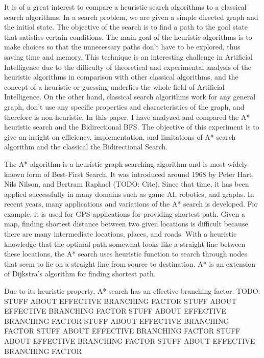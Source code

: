 \documentclass[conference]{IEEEtran}
\begin{document}

It is of a great interest to compare a heuristic search algorithms to a classical search algorithms. In a search problem, we are given a simple directed graph and the initial state. The objective of the search is to find a path to the goal state that satisfies certain conditions. The main goal of the heuristic algorithms is to make choices so that the unnecessary paths don't have to be explored, thus saving time and memory. This technique is an interesting challenge in Artificial Intelligence due to the difficulty of theoretical and experimental analysis of the heuristic algorithms in comparison with other classical algorithms, and the concept of a heuristic or guessing underlies the whole field of Artificial Intelligence. On the other hand, classical search algorithms work for any general graph, don't use any specific properties and characteristics of the graph, and therefore is non-heuristic. In this paper, I have analyzed and compared the A* heuristic search and the Bidirectional BFS. The objective of this experiment is to give an insight on efficiency, implementation, and limitations of A* search algorithm and the classical the Bidirectional Search.

The A* algorithm is a heuristic graph-searching algorithm and is most widely known form of Best-First Search. It was introduced around 1968 by Peter Hart, Nils Nilson, and Bertram Raphael (TODO: Cite). Since that time, it has been applied successfully in many domains such as game AI, robotics, and graphs. In recent years, many applications and variations of the A* search is developed. For example, it is used for GPS applications for providing shortest path. Given a map, finding shortest distance between two given locations is difficult because there are many intermediate locations, places, and roads. With a heuristic knowledge that the optimal path somewhat looks like a straight line between these locations, the A* search uses heuristic function to search through nodes that seem to lie on a straight line from source to destination. A* is an extension of Dijkstra's algorithm for finding shortest path.

Due to its heuristic property, A* search has an effective branching factor. 
TODO:
STUFF ABOUT EFFECTIVE BRANCHING FACTOR
STUFF ABOUT EFFECTIVE BRANCHING FACTOR
STUFF ABOUT EFFECTIVE BRANCHING FACTOR
STUFF ABOUT EFFECTIVE BRANCHING FACTOR
STUFF ABOUT EFFECTIVE BRANCHING FACTOR
STUFF ABOUT EFFECTIVE BRANCHING FACTOR
STUFF ABOUT EFFECTIVE BRANCHING FACTOR
\end{document}

